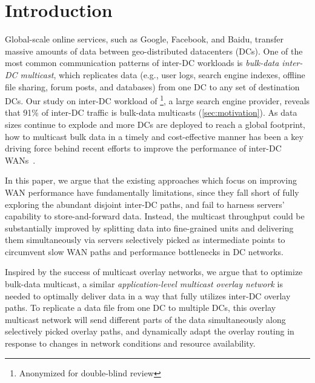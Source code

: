 \section{Introduction}

Global-scale online services, such as Google, Facebook, and
Baidu, transfer massive amounts of data between geo-distributed
datacenters (DCs).
One of the most common communication patterns of inter-DC workloads 
is {\em bulk-data inter-DC multicast},
which replicates data (e.g., user
logs, search engine indexes, offline file sharing, forum posts, and 
databases) from one DC to any set of destination DCs.
Our study on inter-DC workload of \company\footnote{Anonymized for 
double-blind review}, a large search engine provider, reveals that 
91\% of inter-DC traffic is bulk-data multicasts 
(\Section\ref{sec:motivation}).
As data sizes continue to explode and more DCs are deployed to
reach a global footprint, how to multicast bulk data in a timely
and cost-effective manner has been a key driving force behind
recent efforts to improve the performance of inter-DC
WANs~\cite{savage1999Theend,jain2013b4,kumar2015bwe,hong2013achieving,Zhang2015Guaranteeing}.



In this paper, we argue that the existing approaches which focus
on improving WAN performance have fundamentally limitations,
since they fall short of fully exploring the abundant
disjoint inter-DC paths, and fail to harness servers'
capability to store-and-forward data.
Instead, the multicast throughput could be substantially 
improved by splitting data into fine-grained units and delivering 
them simultaneously via servers selectively picked as
intermediate points to circumvent slow WAN paths and performance
bottlenecks in DC networks.


Inspired by the success of multicast overlay
networks, we argue that to optimize bulk-data multicast,
a similar {\em application-level multicast
overlay network} is needed to optimally deliver data in a way that
fully utilizes inter-DC overlay paths.
To replicate a data file from one DC to multiple DCs, this overlay
multicast network will send different parts of the data
simultaneously along selectively picked overlay paths, and
dynamically adapt the overlay routing in response to changes in
network conditions and resource availability.


